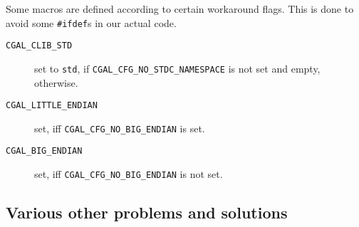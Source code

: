 Some macros are defined according to certain workaround flags. This is
done to avoid some \texttt{\#ifdef}s in our actual code.

\begin{description}
\item[\texttt{CGAL\_CLIB\_STD}] 
  set to \texttt{std}, if
  {\texttt{CGAL\_CFG\_NO\_STDC\_NAMESPACE}} is not set and
  empty, otherwise.
\item[\texttt{CGAL\_LITTLE\_ENDIAN}] set, iff
  {\texttt{CGAL\_CFG\_NO\_BIG\_ENDIAN}} is set.
\item[\texttt{CGAL\_BIG\_ENDIAN}] set, iff
  {\texttt{CGAL\_CFG\_NO\_BIG\_ENDIAN}} is not set.
\end{description}


\subsection{Various other problems and solutions}
\label{sec:various_problems}

%
%

